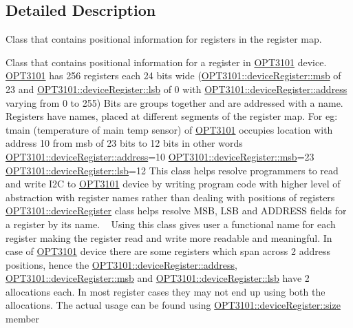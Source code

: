 \subsection{Detailed Description}
Class that contains positional information for registers in the register map. 

Class that contains positional information for a register in \mbox{\hyperlink{namespace_o_p_t3101}{O\+P\+T3101}} device. \mbox{\hyperlink{namespace_o_p_t3101}{O\+P\+T3101}} has 256 registers each 24 bits wide (\mbox{\hyperlink{class_o_p_t3101_1_1device_register_a40f9e71d804ae858b6baed1f12b3cf83}{O\+P\+T3101\+::device\+Register\+::msb}} of 23 and \mbox{\hyperlink{class_o_p_t3101_1_1device_register_a404078f369116e10b1cccfbb77c557ca}{O\+P\+T3101\+::device\+Register\+::lsb}} of 0 with \mbox{\hyperlink{class_o_p_t3101_1_1device_register_a81d25c717489ac388db0fed33c35bedd}{O\+P\+T3101\+::device\+Register\+::address}} varying from 0 to 255) Bits are groups together and are addressed with a name. Registers have names, placed at different segments of the register map. For eg\+: tmain (temperature of main temp sensor) of \mbox{\hyperlink{namespace_o_p_t3101}{O\+P\+T3101}} occupies location with address 10 from msb of 23 bits to 12 bits in other words \mbox{\hyperlink{class_o_p_t3101_1_1device_register_a81d25c717489ac388db0fed33c35bedd}{O\+P\+T3101\+::device\+Register\+::address}}=10 \mbox{\hyperlink{class_o_p_t3101_1_1device_register_a40f9e71d804ae858b6baed1f12b3cf83}{O\+P\+T3101\+::device\+Register\+::msb}}=23 \mbox{\hyperlink{class_o_p_t3101_1_1device_register_a404078f369116e10b1cccfbb77c557ca}{O\+P\+T3101\+::device\+Register\+::lsb}}=12 This class helps resolve programmers to read and write I2C to \mbox{\hyperlink{namespace_o_p_t3101}{O\+P\+T3101}} device by writing program code with higher level of abstraction with register names rather than dealing with positions of registers \mbox{\hyperlink{class_o_p_t3101_1_1device_register}{O\+P\+T3101\+::device\+Register}} class helps resolve M\+SB, L\+SB and A\+D\+D\+R\+E\+SS fields for a register by its name. ~\newline
Using this class gives user a functional name for each register making the register read and write more readable and meaningful. In case of \mbox{\hyperlink{namespace_o_p_t3101}{O\+P\+T3101}} device there are some registers which span across 2 address positions, hence the \mbox{\hyperlink{class_o_p_t3101_1_1device_register_a81d25c717489ac388db0fed33c35bedd}{O\+P\+T3101\+::device\+Register\+::address}}, \mbox{\hyperlink{class_o_p_t3101_1_1device_register_a40f9e71d804ae858b6baed1f12b3cf83}{O\+P\+T3101\+::device\+Register\+::msb}} and \mbox{\hyperlink{class_o_p_t3101_1_1device_register_a404078f369116e10b1cccfbb77c557ca}{O\+P\+T3101\+::device\+Register\+::lsb}} have 2 allocations each. In most register cases they may not end up using both the allocations. The actual usage can be found using \mbox{\hyperlink{class_o_p_t3101_1_1device_register_a058d48b4c23e22739b1c65d85367a0a8}{O\+P\+T3101\+::device\+Register\+::size}} member ~\newline
